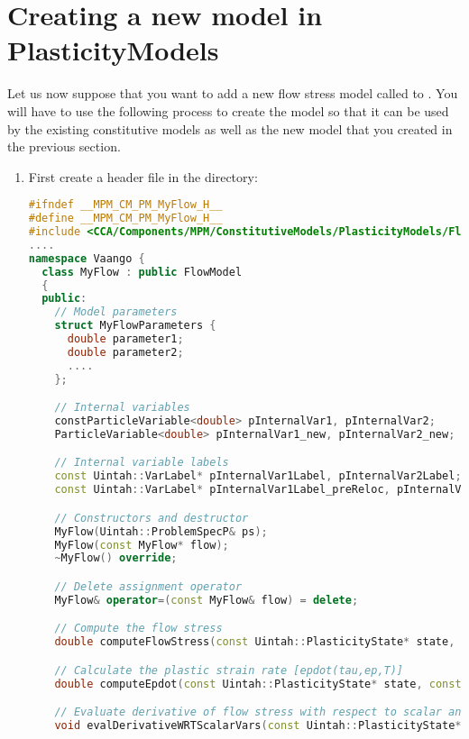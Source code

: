 \section{Creating a new model in PlasticityModels}
Let us now suppose that you want to add a new flow stress model called 
 to \Vaango.  You will have to use the following process to
create the model so that it can be used by the existing constitutive models
as well as the new model that you created in the previous section.
\begin{enumerate}
  \item First create a header file  in the 
        directory:
\begin{lstlisting}[language=Cpp]
#ifndef __MPM_CM_PM_MyFlow_H__
#define __MPM_CM_PM_MyFlow_H__
#include <CCA/Components/MPM/ConstitutiveModels/PlasticityModels/FlowModel.h>
....
namespace Vaango {
  class MyFlow : public FlowModel
  {
  public:
    // Model parameters
    struct MyFlowParameters {
      double parameter1;
      double parameter2;
      ....
    };

    // Internal variables
    constParticleVariable<double> pInternalVar1, pInternalVar2;
    ParticleVariable<double> pInternalVar1_new, pInternalVar2_new;

    // Internal variable labels
    const Uintah::VarLabel* pInternalVar1Label, pInternalVar2Label;
    const Uintah::VarLabel* pInternalVar1Label_preReloc, pInternalVar2Label_preReloc;

    // Constructors and destructor
    MyFlow(Uintah::ProblemSpecP& ps);
    MyFlow(const MyFlow* flow);
    ~MyFlow() override;

    // Delete assignment operator
    MyFlow& operator=(const MyFlow& flow) = delete;

    // Compute the flow stress 
    double computeFlowStress(const Uintah::PlasticityState* state, const double& delT, const double& tolerance, const Uintah::MPMMaterial* matl, const Uintah::particleIndex idx) override;

    // Calculate the plastic strain rate [epdot(tau,ep,T)]
    double computeEpdot(const Uintah::PlasticityState* state, const double& delT, const double& tolerance, const Uintah::MPMMaterial* matl, const Uintah::particleIndex idx) override;

    // Evaluate derivative of flow stress with respect to scalar and internal variables.
    void evalDerivativeWRTScalarVars(const Uintah::PlasticityState* state, const Uintah::particleIndex idx, Uintah::Vector& derivs) override;


\end{lstlisting}
\end{enumerate}
